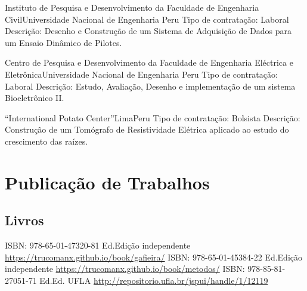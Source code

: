 \documentclass[11pt,a4paper,sans]{moderncv} %
\begin{document}
		      {Instituto de Pesquisa e Desenvolvimento da Faculdade 
		      de Engenharia Civil}{Universidade Nacional de Engenharia }{Peru}
		      {Tipo de contratação: Laboral\newline{}
		      Descrição: Desenho e  Construção  de  um  Sistema  de  
		      Adquisição  de  Dados para  um  Ensaio  Dinâmico  de  Pilotes.}

		      {Centro de Pesquisa e Desenvolvimento da Faculdade de 
		      Engenharia Eléctrica e Eletrônica}{Universidade Nacional de Engenharia }{Peru}
		      {Tipo de contratação: Laboral\newline{}
		      Descrição: Estudo, Avaliação, Desenho e implementação de um sistema Bioeletrônico II.}

		      {``International Potato Center''}{Lima}{Peru}
		      {Tipo de contratação: Bolsista\newline{}
		      Descrição: Construção  de  um  Tomógrafo  de  Resistividade 
		      Elétrica  aplicado ao  estudo  do  crescimento  das  raízes.}


\section{Publicação de Trabalhos}
\subsection{Livros}
	      {ISBN: 978-65-01-47320-8}{1 Ed.}{Edição independente}
	      {\url{https://trucomanx.github.io/book/gafieira/}}
	      {ISBN: 978-65-01-45384-2}{2 Ed.}{Edição independente}
	      {\url{https://trucomanx.github.io/book/metodos/}}
	      {ISBN: 978-85-81-27051-7}{1 Ed.}{Ed. UFLA}
	      {\url{http://repositorio.ufla.br/jspui/handle/1/12119}}
\end{document}

